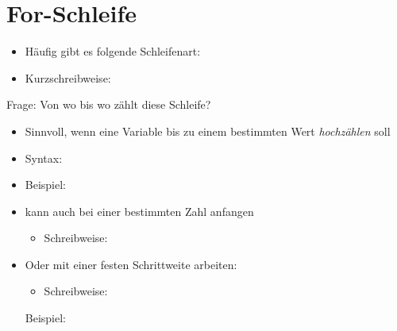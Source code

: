 \section{For-Schleife}
\begin{frame}
	\slidehead

	\begin{itemize}
		\vspace{-0.1cm}
		\item Häufig gibt es folgende Schleifenart:
			\vspace{0.15cm}

		\pause
		\item Kurzschreibweise:
		\vspace{0.15cm}
	\end{itemize}
	\begin{block}{Frage:}
		Von wo bis wo zählt diese Schleife?
	\end{block}
\end{frame}

\begin{frame}
	\slidehead

	\begin{itemize}
		\item Sinnvoll, wenn eine Variable bis zu einem bestimmten Wert \textit{hochzählen} soll
		\item Syntax:
		\item Beispiel:
	\end{itemize}
\end{frame}

\begin{frame}
	\slidehead

	\begin{itemize}
		\item {} kann auch bei einer bestimmten Zahl anfangen
		\begin{itemize}
			\item Schreibweise: 
		\end{itemize}
		\item Oder mit einer festen Schrittweite arbeiten:
		\begin{itemize}
			\item Schreibweise: 
		\end{itemize}
		Beispiel:
	\end{itemize}
\end{frame}

